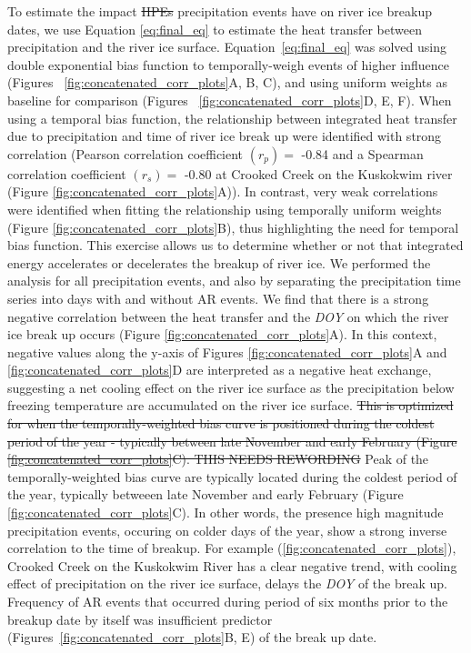 \documentclass[12pts,draft]{AR_analysis_}
\begin{document}
To estimate the impact \st{HPEs} precipitation events have on river ice breakup dates, we use 
Equation \ref{eq:final_eq} to estimate the heat transfer
between precipitation and the river ice surface.
Equation~\ref{eq:final_eq} was solved using double exponential bias
function to temporally-weigh events of higher influence (Figures~
		\ref{fig:concatenated_corr_plots}A, B, C), and using
uniform weights as baseline for comparison (Figures~
		\ref{fig:concatenated_corr_plots}D, E, F).
When using a temporal bias function, the relationship between integrated
heat transfer due to precipitation and time of river ice break up were
identified with strong correlation (Pearson correlation coefficient
		$(r_{p} )=$ -0.84 and a Spearman correlation coefficient
		$(r_{s}) =$ -0.80 at Crooked Creek on the Kuskokwim river
		(Figure \ref{fig:concatenated_corr_plots}A)).
In contrast, very weak correlations were identified when fitting the
relationship using temporally uniform weights (Figure
		\ref{fig:concatenated_corr_plots}B), thus highlighting the need
for temporal bias function.
This exercise allows us to 
determine whether or not that integrated 
energy accelerates or decelerates the breakup of river ice. We performed the
analysis for all precipitation events, and also by separating the
precipitation time series into days with and without AR events. 
We find that there is a strong negative correlation between the heat 
transfer and the \emph{DOY} 
on which the river ice break up occurs (Figure
\ref{fig:concatenated_corr_plots}A). In this context, negative values 
along the y-axis of Figures \ref{fig:concatenated_corr_plots}A and 
\ref{fig:concatenated_corr_plots}D 
are interpreted
as a negative heat exchange, suggesting a net cooling effect on the river ice
surface as the precipitation below freezing temperature are accumulated
on the river ice surface. 
\st{This is optimized for 
when the temporally-weighted bias curve
is positioned during the coldest period of the year - typically between
late November and early February (Figure
		{\ref{fig:concatenated_corr_plots}}C). THIS NEEDS REWORDING}
Peak of the temporally-weighted bias curve are typically located during
the coldest period of the year, typically betweeen late November and
early February (Figure {\ref{fig:concatenated_corr_plots}}C).
In other words, the presence high magnitude precipitation events, occuring 
on colder days of the 
year, show a strong inverse correlation to the time of breakup. 
For example (\ref{fig:concatenated_corr_plots}), Crooked Creek on the Kuskokwim River has a
clear negative trend, with cooling effect of precipitation on the
river ice surface, delays the \emph{DOY} of the break up. 
Frequency of AR events that occurred during period of six months prior to
the breakup date by itself was insufficient predictor
(Figures~\ref{fig:concatenated_corr_plots}B, E) of the break up
date. 
\end{document}
